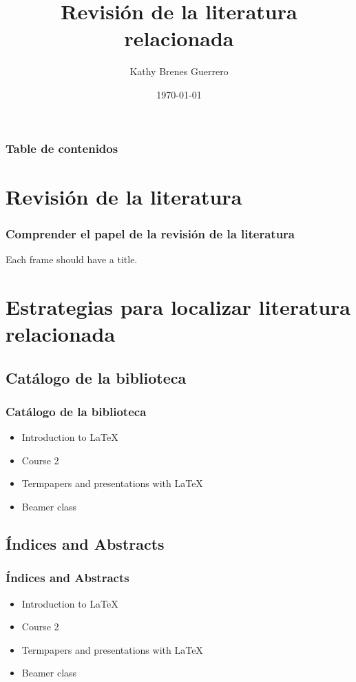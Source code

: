 \documentclass{beamer}
\begin{document}
\title{Revisi\'on de la literatura relacionada}  
\author{Kathy Brenes Guerrero}
\date{\today} 


\begin{frame}
\titlepage
\end{frame}

\begin{frame}\frametitle{Table de contenidos}\tableofcontents
\end{frame} 


\section{Revisi\'on de la literatura} %
\begin{frame}\frametitle{Comprender el papel de la revisi\'on de la literatura} 
Each frame should have a title.
\end{frame}

\section{Estrategias para localizar literatura relacionada} 
\subsection{Cat\'alogo de la biblioteca}
\begin{frame}\frametitle{Catálogo de la biblioteca}
\begin{itemize}
\item Introduction to  \LaTeX  
\item Course 2 
\item Termpapers and presentations with \LaTeX 
\item Beamer class
\end{itemize} 
\end{frame}

\subsection{\'Indices and Abstracts}
\begin{frame}\frametitle{\'Indices and Abstracts}
\begin{itemize}
\item Introduction to  \LaTeX  
\item Course 2 
\item Termpapers and presentations with \LaTeX 
\item Beamer class
\end{itemize} 
\end{frame}
\end{document}

